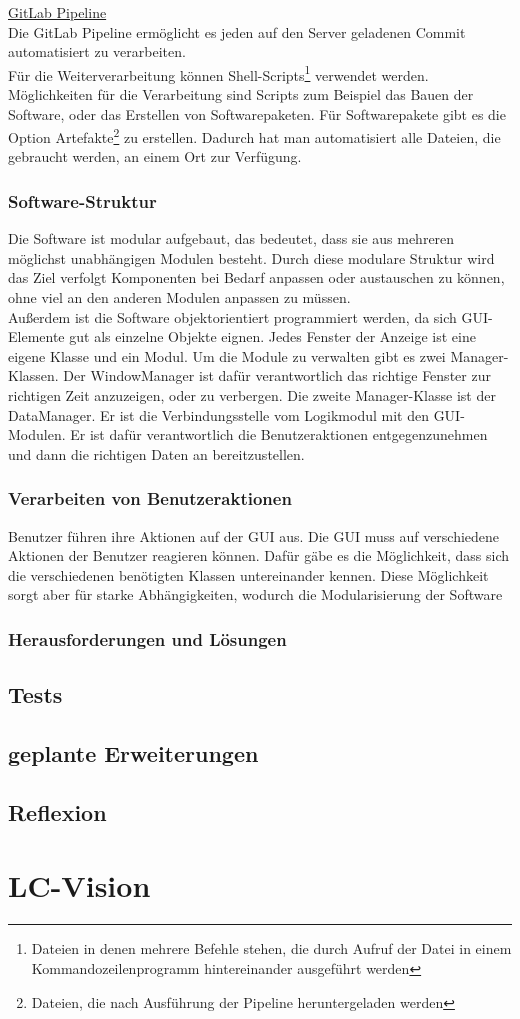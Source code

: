 \documentclass[12pt,a4paper]{article}
\begin{document}
\underline{GitLab Pipeline}\\
Die GitLab Pipeline ermöglicht es jeden auf den Server geladenen Commit automatisiert zu verarbeiten. \\
Für die Weiterverarbeitung können Shell-Scripts\footnote{Dateien in denen mehrere Befehle stehen, die durch Aufruf der Datei in einem Kommandozeilenprogramm hintereinander ausgeführt werden} verwendet werden. \\Möglichkeiten für die Verarbeitung sind Scripts zum Beispiel das Bauen der Software, oder das Erstellen von Softwarepaketen. Für Softwarepakete gibt es die Option Artefakte\footnote{Dateien, die nach Ausführung der Pipeline heruntergeladen werden} zu erstellen. Dadurch hat man automatisiert alle Dateien, die gebraucht werden, an einem Ort zur Verfügung.
\subsubsection{Software-Struktur}
Die Software ist modular aufgebaut, das bedeutet, dass sie aus mehreren möglichst unabhängigen Modulen besteht. Durch diese modulare Struktur wird das Ziel verfolgt Komponenten bei Bedarf anpassen oder austauschen zu können, ohne viel an den anderen Modulen anpassen zu müssen. \\
Außerdem ist die Software objektorientiert programmiert werden, da sich GUI-Elemente gut als einzelne Objekte eignen. Jedes Fenster der Anzeige ist eine eigene Klasse und ein Modul. Um die Module zu verwalten gibt es zwei Manager-Klassen. Der WindowManager ist dafür verantwortlich das richtige Fenster zur richtigen Zeit anzuzeigen, oder zu verbergen. Die zweite Manager-Klasse ist der DataManager. Er ist die Verbindungsstelle vom Logikmodul mit den GUI-Modulen. Er ist dafür verantwortlich die Benutzeraktionen entgegenzunehmen und dann die richtigen Daten an bereitzustellen. 

\subsubsection{Verarbeiten von Benutzeraktionen}
Benutzer führen ihre Aktionen auf der GUI aus. Die GUI muss auf verschiedene Aktionen der Benutzer reagieren können. Dafür gäbe es die Möglichkeit, dass sich die verschiedenen benötigten Klassen untereinander kennen. Diese Möglichkeit sorgt aber für starke Abhängigkeiten, wodurch die Modularisierung der Software 
\subsubsection{Herausforderungen und Lösungen}
\subsection{Tests}
\subsection{geplante Erweiterungen}
\subsection{Reflexion}

\section{LC-Vision}
\newpage

\newpage


\end{document}
